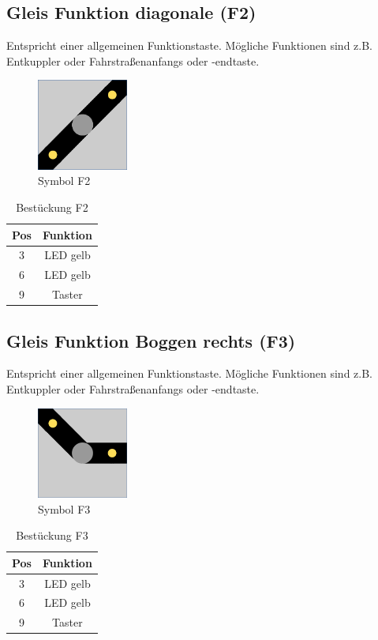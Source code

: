 \documentclass[10pt,a4paper]{article}
\begin{document}
\subsection{Gleis Funktion diagonale (F2)}
Entspricht einer allgemeinen Funktionstaste. Mögliche Funktionen sind z.B. Entkuppler oder Fahrstraßenanfangs oder -endtaste.
\begin{figure}[hbtp]
\centering
\includegraphics[width=3cm]{../folien/f2.png}
\caption{Symbol F2}
\end{figure}
\begin{table}[h!]
\centering
\begin{tabular}{c|c}
\textbf{Pos} & \textbf{Funktion} \\ \hline
3 & LED gelb \\
6 & LED gelb \\
9 & Taster
\end{tabular}
\caption{Bestückung F2}
\end{table}

\newpage
\subsection{Gleis Funktion Boggen rechts (F3)}
Entspricht einer allgemeinen Funktionstaste. Mögliche Funktionen sind z.B. Entkuppler oder Fahrstraßenanfangs oder -endtaste.
\begin{figure}[hbtp]
\centering
\includegraphics[width=3cm]{../folien/f3.png}
\caption{Symbol F3}
\end{figure}
\begin{table}[h!]
\centering
\begin{tabular}{c|c}
\textbf{Pos} & \textbf{Funktion} \\ \hline
3 & LED gelb \\
6 & LED gelb \\
9 & Taster
\end{tabular}
\caption{Bestückung F3}
\end{table}
 
\end{document}
